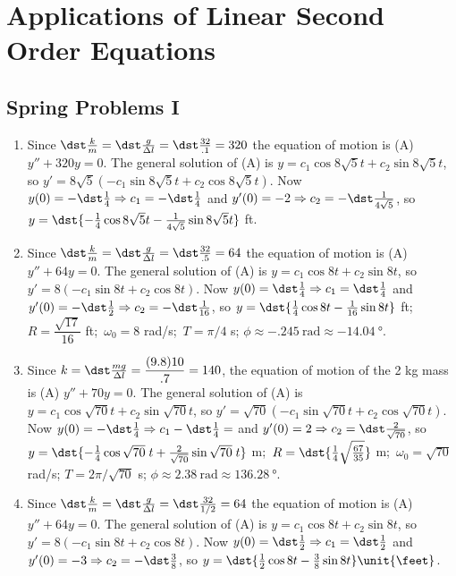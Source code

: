 \documentclass[openany]{book}
\newenvironment{sectionSolutions}{
 \begin{enumerate}[item-label={\thesection.\arabic{enumi}.}]
}{
 \end{enumerate}
}
\begin{document}
\chapter{Applications of Linear Second Order Equations}

\section{Spring Problems I}
\begin{sectionSolutions}
\item
Since $\dst\frac{k}{ m}=\dst\frac{g}{\Delta l}=\dst\frac{32}{.1}=320$ the
equation of motion is (A) $y''+320y=0$. The general solution of (A) is
$y=c_1\cos8\sqrt5t+c_2\sin8\sqrt5t$, so $y'=8\sqrt5(-c_1\sin8\sqrt5
t+c_2\cos8\sqrt5t)$. Now $y(0)=-\dst\frac{1}{4}\Rightarrow
c_1=-\dst\frac{1}{4}$ and $y'(0)=-2\Rightarrow
c_2=-\dst\frac{1}{4\sqrt5}$, so $y=\dst{
-\frac{1}{4}\cos8\sqrt{5}t-\frac{1}{ 4\sqrt{5}}\sin8\sqrt{5}t}$ ft.


\item
Since $\dst\frac{k}{ m}=\dst\frac{g}{\Delta l}=\dst\frac{32}{.5}=64$ the
equation of motion is (A) $y''+64y=0$. The general solution of (A) is
$y=c_1\cos8t+c_2\sin8t$, so $y'=8(-c_1\sin8t+c_2\cos8t)$. Now
$y(0)=\dst\frac{1}{4}\Rightarrow c_1=\dst\frac{1}{4}$ and
$y'(0)=-\dst\frac{1}{2}\Rightarrow c_2=-\dst\frac{1}{16}$, so
$y=\dst{\frac{1}{4}\cos8t-\frac{1}{16}\sin8t}$ ft;\;
$R=\dfrac{\sqrt{17}}{16}$ ft;\ $\omega_0=8$ rad/s;\ $T=\pi/4$ s;
$\phi\approx\qty{-.245}{\radian}\approx\qty{-14.04}{\degree}$.


\item
Since $k=\dst\frac{mg}{\Delta l}=\dfrac{(9.8)10}{.7}=140$, the equation
of motion of the 2 kg mass is (A) $y''+70y=0$. The general solution of
(A) is $y=c_1\cos\sqrt{70}t+c_2\sin\sqrt{70}t$, so
$y'=\sqrt{70}(-c_1\sin\sqrt{70}t+c_2\cos\sqrt{70}t)$. Now
$y(0)=-\dst\frac{1}{4}\Rightarrow c_1-\dst\frac{1}{4}=$ and
$y'(0)=2\Rightarrow c_2=\dst\frac{2}{\sqrt{70}}$, so
$y=\dst{-\frac{1}{4}\cos\sqrt{70}\;t+\frac{2
}{\sqrt{70}}\sin\sqrt{70}\;t}$ m;\ $R= \dst{\frac{1}{4}\sqrt\frac{67}{
35}}$ m;\ $\omega_0=\sqrt{70}$ rad/s; $T=2\pi/\sqrt{70}$ s;\;
$\phi\approx\qty{2.38}{\radian}\approx\qty{136.28}{\degree}$.


\item
Since $\dst\frac{k}{ m}=\dst\frac{g}{\Delta l}=\dst\frac{32}{1/2}=64$ the
equation of motion is (A) $y''+64y=0$. The general solution of (A) is
$y=c_1\cos8t+c_2\sin8t$, so $y'=8(-c_1\sin8t+c_2\cos8t)$. Now
$y(0)=\dst\frac{1}{2}\Rightarrow c_1=\dst\frac{1}{2}$ and
$y'(0)=-3\Rightarrow c_2=-\dst\frac{3}{8}$, so
$y=\dst{\frac{1}{2}\cos8t-\frac{3}{8}\sin 8t}\unit{\feet}$.



\end{sectionSolutions}
\end{document}
